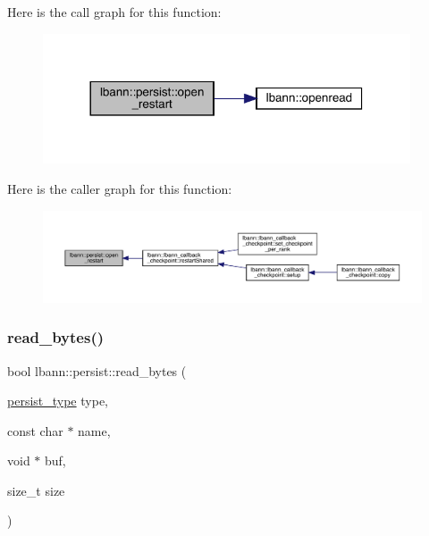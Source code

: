Here is the call graph for this function\+:\nopagebreak
\begin{figure}[H]
\begin{center}
\leavevmode
\includegraphics[width=308pt]{classlbann_1_1persist_a123cbc1d2b693640c784a45cbc6d2d97_cgraph}
\end{center}
\end{figure}
Here is the caller graph for this function\+:\nopagebreak
\begin{figure}[H]
\begin{center}
\leavevmode
\includegraphics[width=350pt]{classlbann_1_1persist_a123cbc1d2b693640c784a45cbc6d2d97_icgraph}
\end{center}
\end{figure}
\mbox{\label{classlbann_1_1persist_af24f635f634c8cf30cf53a0e90ec641b}} 
\subsubsection{\texorpdfstring{read\+\_\+bytes()}{read\_bytes()}}
{\footnotesize\ttfamily bool lbann\+::persist\+::read\+\_\+bytes (\begin{DoxyParamCaption}\item[{\hyperlink{namespacelbann_adee41f31f15f3906cbdcce4a1417eb56}{persist\+\_\+type}}]{type,  }\item[{const char $\ast$}]{name,  }\item[{void $\ast$}]{buf,  }\item[{size\+\_\+t}]{size }\end{DoxyParamCaption})}



